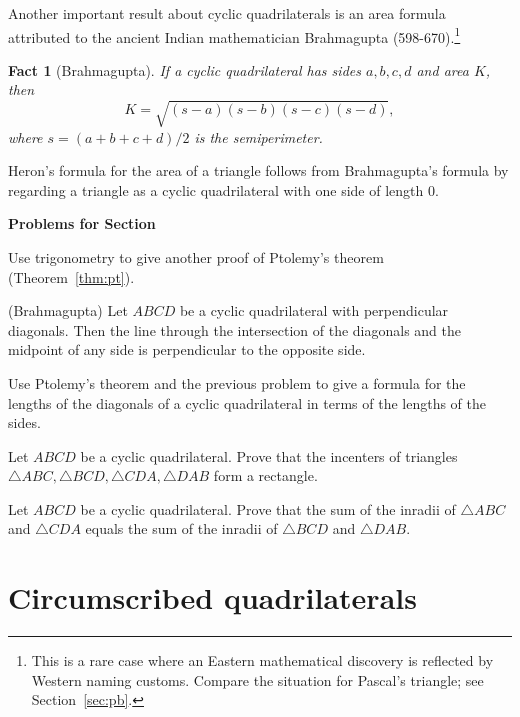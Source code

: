 \documentclass[12pt]{book}
\newcounter{exc}
\numberwithin{exc}{section}
\numberwithin{figure}{section}
\newenvironment{exer}{\vspace{0.1in}
\noindent \textbf{Problems for Section~\thesection} \vspace{0.1in}
\begin{list}{\arabic{exc}.}{\usecounter{exc}}}{\end{list}}
\newtheorem{fact}[theorem]{Fact}
\numberwithin{equation}{theorem}
\def\ii{\item}
\begin{document}
Another important result about cyclic quadrilaterals is an area formula 
attributed to the ancient Indian mathematician 
 
Brahmagupta (598-670).\footnote{This is a rare 
case where an Eastern mathematical
discovery is reflected by Western naming customs. Compare the situation
for Pascal's triangle; see Section~\ref{sec:pb}.}
\begin{fact}[Brahmagupta] \label{fact:brahmagupta}
If a cyclic quadrilateral has sides $a,b,c,d$ and area $K$, then
\[
K = \sqrt{(s-a)(s-b)(s-c)(s-d)},
\]
where $s = (a+b+c+d)/2$ is the semiperimeter.
\end{fact}
Heron's formula 
for the area of a triangle follows from Brahmagupta's 
formula by regarding a triangle as a cyclic quadrilateral with one 
side of length 0. 

\begin{exer}
\ii
Use trigonometry to give another proof of Ptolemy's theorem
(Theorem~\ref{thm:pt}).
\ii (Brahmagupta) 
Let $ABCD$ be a cyclic quadrilateral with perpendicular diagonals.  
Then the line through the intersection of the diagonals and the 
midpoint of any side is perpendicular to the opposite side.
\ii
Use Ptolemy's theorem and the previous problem to give
a formula for the lengths of the diagonals of a cyclic quadrilateral
in terms of the lengths of the sides.
\ii \label{ex:inrect}
Let $ABCD$ be a cyclic quadrilateral. Prove that the incenters of 
triangles $\triangle ABC, \triangle BCD, \triangle CDA, 
\triangle DAB$ form a rectangle.
\ii
Let $ABCD$ be a cyclic quadrilateral.
Prove that the sum of the inradii of $\triangle ABC$ and 
$\triangle CDA$ equals the sum of the inradii of $\triangle BCD$ 
and $\triangle DAB$.
\end{exer}

\section{Circumscribed quadrilaterals}
\end{document}
